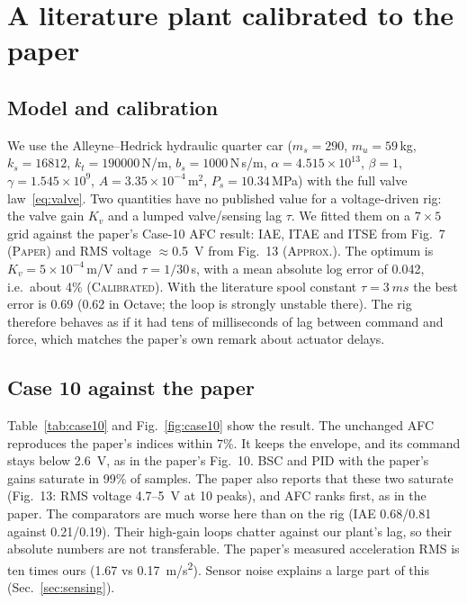 \documentclass[10pt,a4paper]{article}
\newcommand{\evid}[1]{\textsc{#1}}
\begin{document}
\section{A literature plant calibrated to the paper}
\subsection{Model and calibration}
We use the Alleyne--Hedrick hydraulic quarter car (\(m_s=290\), \(m_u=59\)\,kg, \(k_s=16812\), \(k_t=190000\)\,N/m, \(b_s=1000\)\,N\,s/m, \(\alpha=4.515\times10^{13}\), \(\beta=1\), \(\gamma=1.545\times10^9\), \(A=3.35\times10^{-4}\)\,m\(^2\), \(P_s=10.34\)\,MPa) \cite{alleyne1995} with the full valve law~\eqref{eq:valve}. Two quantities have no published value for a voltage-driven rig: the valve gain \(K_v\) and a lumped valve/sensing lag \(\tau\). We fitted them on a \(7\times5\) grid against the paper's Case-10 AFC result: IAE, ITAE and ITSE from Fig.~7 (\evid{Paper}) and RMS voltage \(\approx\)\SI{0.5}{V} from Fig.~13 (\evid{Approx.}). The optimum is \(K_v=5\times10^{-4}\)\,m/V and \(\tau=1/30\)\,s, with a mean absolute log error of 0.042, i.e.\ about 4\% (\evid{Calibrated}). With the literature spool constant \(\tau=\SI{3}{ms}\) the best error is 0.69 (0.62 in Octave; the loop is strongly unstable there). The rig therefore behaves as if it had tens of milliseconds of lag between command and force, which matches the paper's own remark about actuator delays.

\subsection{Case 10 against the paper}
\begin{table}[!htbp]
\centering\small
\caption{Case 10 (0.043\,m, 0.505\,Hz) on the calibrated plant, all controllers with the paper's Case-A gains. \evid{Paper} values from Figs.~7 and 13 (\(^\ast\)\evid{Approx.}).}
\label{tab:case10}
\end{table}
Table~\ref{tab:case10} and Fig.~\ref{fig:case10} show the result. The unchanged AFC reproduces the paper's indices within 7\%. It keeps the envelope, and its command stays below \SI{2.6}{V}, as in the paper's Fig.~10. BSC and PID with the paper's gains saturate in 99\% of samples. The paper also reports that these two saturate (Fig.~13: RMS voltage 4.7--\SI{5}{V} at 10 peaks), and AFC ranks first, as in the paper. The comparators are much worse here than on the rig (IAE 0.68/0.81 against 0.21/0.19). Their high-gain loops chatter against our plant's lag, so their absolute numbers are not transferable. The paper's measured acceleration RMS is ten times ours (1.67 vs \SI{0.17}{m/s^2}). Sensor noise explains a large part of this (Sec.~\ref{sec:sensing}).
\end{document}
